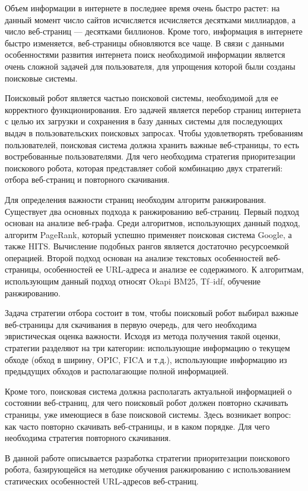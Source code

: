 \startprefacepage

Объем информации в интернете в последнее время очень быстро растет: на данный момент число сайтов исчисляется исчисляется десятками миллиардов, а число веб-страниц --- десятками биллионов. Кроме того, информация в интернете быстро изменяется, веб-страницы обновляются все чаще.  В связи с данными особенностями развития интернета поиск необходимой информации является очень сложной задачей для пользователя, для упрощения которой были созданы поисковые системы. 

Поисковый робот является частью поисковой системы, необходимой для ее корректного функционирования. Его задачей является перебор страниц интернета с целью их загрузки и сохранения в базу данных системы для последующих выдач в пользовательских поисковых запросах. Чтобы удовлетворять требованиям пользователей, поисковая система должна хранить важные веб-страницы, то есть востребованные пользователями. Для чего необходима стратегия приоритезации поискового робота, которая представляет собой комбинацию двух стратегий: отбора веб-страниц и повторного скачивания.

Для определения важности страниц необходим алгоритм ранжирования. Существует два основных подхода к ранжированию веб-страниц. Первый подход основан на анализе веб-графа. Среди алгоритмов, использующих данный подход, алгоритм PageRank, который успешно применяет поисковая система Google, а также HITS. Вычисление подобных рангов является достаточно ресурсоемкой операцией. Второй подход основан на анализе текстовых особенностей веб-страницы, особенностей ее URL-адреса и анализе ее содержимого. К алгоритмам, использующим данный подход относят Okapi BM25, Tf–idf, обучение ранжированию.

Задача стратегии отбора состоит в том, чтобы поисковый робот выбирал важные веб-страницы для скачивания в первую очередь, для чего необходима эвристическая оценка важности. Исходя из метода получения такой оценки, стратегии разделяют на три категории: использующие информацию о текущем обходе (обход в ширину, OPIC, FICA и т.д.), использующие информацию из предыдущих обходов и располагающие полной информацией.

Кроме того, поисковая система должна располагать актуальной информацией о состоянии веб-страниц, для чего поисковый робот должен повторно скачивать страницы, уже имеющиеся в базе поисковой системы. Здесь возникает вопрос: как часто повторно скачивать веб-страницы, и в каком порядке. Для чего необходима стратегия повторного скачивания.

В данной работе описывается разработка стратегии приоритезации поискового робота, базирующейся на методике обучения ранжированию с использованием статических особенностей URL-адресов веб-страниц.

